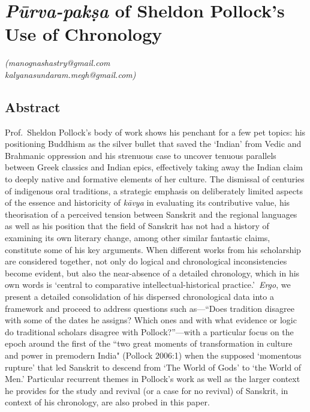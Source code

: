 
\chapter{\textit{Pūrva-pakṣa} of Sheldon Pollock's Use of Chronology}\label{chapter1}





\begin{flushright}
\textit{(manognashastry@gmail.com}\\\textit{kalyanasundaram.megh@gmail.com)}
\end{flushright}


\section*{Abstract}

Prof.~Sheldon Pollock’s body of work shows his penchant for a few pet topics: his positioning Buddhism as the silver bullet that saved the ‘Indian’ from Vedic and Brahmanic oppression and his strenuous case to uncover tenuous parallels between Greek classics and Indian epics, effectively taking away the Indian claim to deeply native and formative elements of her culture. The dismissal of centuries of indigenous oral traditions, a strategic emphasis on deliberately limited aspects of the essence and historicity of  \textit{kāvya} in evaluating its contributive value, his theorisation of a perceived tension between Sanskrit and the regional languages as well as his position that the field of Sanskrit has not had a history of examining its own literary change, among other similar fantastic claims, constitute some of his key arguments. When different works from his scholarship are considered together, not only do logical and chronological inconsistencies become evident, but also the near-absence of a detailed chronology, which in his own words is ‘central to comparative intellectual-historical practice.’~\textit{Ergo}, we present a detailed consolidation of his dispersed chronological data into a framework and proceed to address questions such as—“Does tradition disagree with some of the dates he assigns? Which ones and with what evidence or logic do traditional scholars disagree with Pollock?”—with a particular focus on the epoch around the first of the ``two great moments of transformation in culture and power in premodern India" (Pollock 2006:1) when the supposed ‘momentous rupture’ that led Sanskrit to descend from ‘The World of Gods’ to ‘the World of Men.’ Particular recurrent themes in Pollock’s work as well as the larger context he provides for the study and revival (or a case for no revival) of Sanskrit, in context of his chronology, are also probed in this paper.




